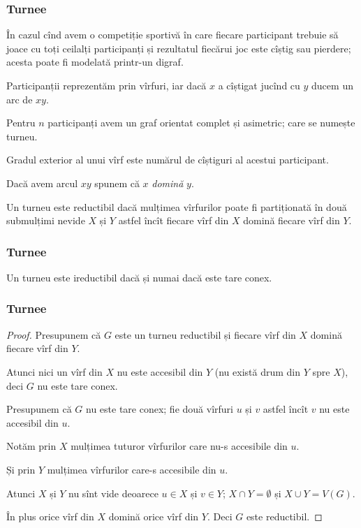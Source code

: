 \begin{frame}
  \frametitle{Turnee}

În cazul cînd avem o competiție sportivă în care fiecare participant trebuie să joace cu toți ceilalți participanți și rezultatul fiecărui joc este cîștig sau pierdere; acesta poate fi modelată printr-un digraf.

Participanții reprezentăm prin vîrfuri, iar dacă $x$ a cîștigat jucînd cu $y$ ducem un arc de $xy$.

Pentru $n$ participanți avem un graf orientat complet și asimetric; care se numește turneu.

Gradul exterior al unui vîrf este numărul de cîștiguri al acestui participant.

Dacă avem arcul $xy$ spunem că $x$ \emph{domină} $y$.

Un turneu este reductibil dacă mulțimea vîrfurilor poate fi partiționată în două submulțimi nevide $X$ și $Y$ astfel încît fiecare vîrf din $X$ domină fiecare vîrf din $Y$.

\end{frame}

\begin{frame}
  \frametitle{Turnee}

\begin{theorem}
Un turneu este ireductibil dacă și numai dacă este tare conex. 
\end{theorem}

\end{frame}

\begin{frame}
  \frametitle{Turnee}
 
\begin{proof}
Presupunem că $G$ este un turneu reductibil și fiecare vîrf din $X$ domină fiecare vîrf din $Y$.

Atunci nici un vîrf din $X$ nu este accesibil din $Y$ (nu există drum din $Y$ spre $X$), deci $G$ nu este tare conex.

Presupunem că $G$ nu este tare conex; fie două vîrfuri $u$ și $v$ astfel încît $v$ nu este accesibil din $u$.

Notăm prin $X$ mulțimea tuturor vîrfurilor care nu-s accesibile din $u$.

Și prin $Y$ mulțimea vîrfurilor care-s accesibile din $u$.

Atunci $X$ și $Y$ nu sînt vide deoarece $u\in X$ și $v\in Y$; $X\cap Y=\emptyset$ și $X\cup Y=V(G)$.

În plus orice vîrf din $X$ domină orice vîrf din $Y$. Deci $G$ este reductibil.

\end{proof}
\end{frame}

